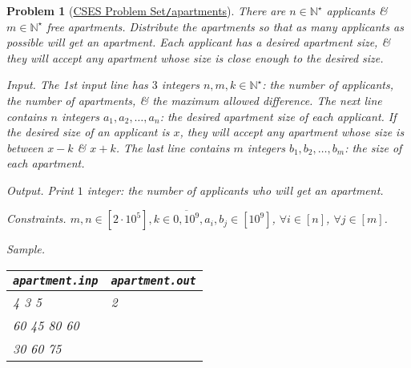 \documentclass{article}
\newtheorem{problem}{Problem}
\begin{document}
\begin{problem}[\href{https://cses.fi/problemset/task/1084}{CSES Problem Set{\tt/}apartments}]
    There are $n\in\mathbb{N}^\star$ applicants \& $m\in\mathbb{N}^\star$ free apartments. Distribute the apartments so that as many applicants as possible will get an apartment. Each applicant has a desired apartment size, \& they will accept any apartment whose size is close enough to the desired size.
    \item {\sf Input.} The 1st input line has $3$ integers $n,m,k\in\mathbb{N}^\star$: the number of applicants, the number of apartments, \& the maximum allowed difference. The next line contains $n$ integers $a_1,a_2,\ldots,a_n$: the desired apartment size of each applicant. If the desired size of an applicant is $x$, they will accept any apartment whose size is between $x - k$ \& $x + k$. The last line contains $m$ integers $b_1,b_2,\ldots,b_m$: the size of each apartment.
    \item {\sf Output.} Print $1$ integer: the number of applicants who will get an apartment.
    \item {\sf Constraints.} $m,n\in[2\cdot10^5],k\in\overline{0,10^9},a_i,b_j\in[10^9]$, $\forall i\in[n]$, $\forall j\in[m]$.
    \item {\sf Sample.}
    \begin{table}[H]
        \centering
        \begin{tabular}{|l|l|}
            \hline
            \verb|apartment.inp| & \verb|apartment.out| \\
            \hline
            4 3 5 & 2 \\
            60 45 80 60 & \\
            30 60 75 & \\
            \hline
        \end{tabular}
    \end{table}
\end{problem}
\end{document}

